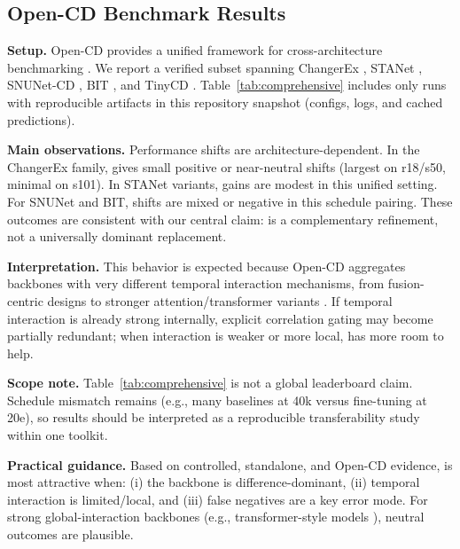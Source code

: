 \subsection{Open-CD Benchmark Results}
\noindent\textbf{Setup.} Open-CD provides a unified framework for cross-architecture benchmarking \cite{li2024opencd}. We report a verified subset spanning ChangerEx \cite{fang2022changer}, STANet \cite{chen2020stanet}, SNUNet-CD \cite{fang2021snunetcd}, BIT \cite{chen2022bit}, and TinyCD \cite{codegoni2022tinycd}. Table~\ref{tab:comprehensive} includes only runs with reproducible artifacts in this repository snapshot (configs, logs, and cached predictions).



\noindent\textbf{Main observations.} Performance shifts are architecture-dependent. In the ChangerEx family, \cosa{} gives small positive or near-neutral shifts (largest on r18/s50, minimal on s101). In STANet variants, gains are modest in this unified setting. For SNUNet and BIT, shifts are mixed or negative in this schedule pairing. These outcomes are consistent with our central claim: \cosa{} is a complementary refinement, not a universally dominant replacement.

\noindent\textbf{Interpretation.} This behavior is expected because Open-CD aggregates backbones with very different temporal interaction mechanisms, from fusion-centric designs to stronger attention/transformer variants \cite{w2022,wei2024,xiaowen2024,yan2024}. If temporal interaction is already strong internally, explicit correlation gating may become partially redundant; when interaction is weaker or more local, \cosa{} has more room to help.

\noindent\textbf{Scope note.} Table~\ref{tab:comprehensive} is not a global leaderboard claim. Schedule mismatch remains (e.g., many baselines at 40k versus \cosa{} fine-tuning at 20e), so results should be interpreted as a reproducible transferability study within one toolkit.

\noindent\textbf{Practical guidance.} Based on controlled, standalone, and Open-CD evidence, \cosa{} is most attractive when: (i) the backbone is difference-dominant, (ii) temporal interaction is limited/local, and (iii) false negatives are a key error mode. For strong global-interaction backbones (e.g., transformer-style models \cite{chen2022bit,bandara2022changeformer,w2022}), neutral outcomes are plausible.
